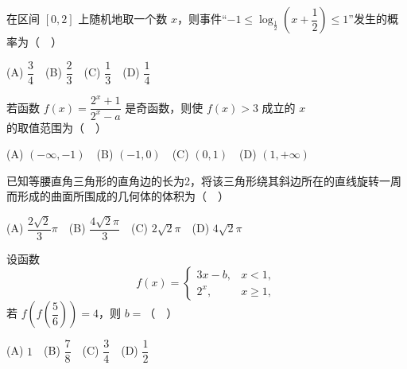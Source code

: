 \begin{question}
在区间 \([0,2]\) 上随机地取一个数 \(x\)，则事件“\(-1\leqslant\log_{\frac12}\left(x+\dfrac12\right)\leqslant1\)”发生的概率为（　）

(A) \(\dfrac34\)　(B) \(\dfrac23\)　(C) \(\dfrac13\)　(D) \(\dfrac14\)

\end{question}
\begin{question}
若函数 \(f(x)=\dfrac{2^x+1}{2^x-a}\) 是奇函数，则使 \(f(x)>3\) 成立的 \(x\) 的取值范围为（　）

(A) \((-\infty,-1)\)　(B) \((-1,0)\)　(C) \((0,1)\)　(D) \((1,+\infty)\)

\end{question}
\begin{question}
已知等腰直角三角形的直角边的长为2，将该三角形绕其斜边所在的直线旋转一周而形成的曲面所围成的几何体的体积为（　）

(A) \(\dfrac{2\sqrt2}{3}\pi\)　(B) \(\dfrac{4\sqrt2\pi}{3}\)　(C) \(2\sqrt2\pi\)　(D) \(4\sqrt2\pi\)

\end{question}
\begin{question}
设函数
\nopagebreak[4]
\[
f(x)=\begin{cases}3x-b,&x<1,\\2^x,&x\geqslant1,\end{cases}
\]
若 \(f\left(f\left(\dfrac56\right)\right)=4\)，则 \(b=\)（　）

(A) \(1\)　(B) \(\dfrac78\)　(C) \(\dfrac34\)　(D) \(\dfrac12\)

\end{question}

